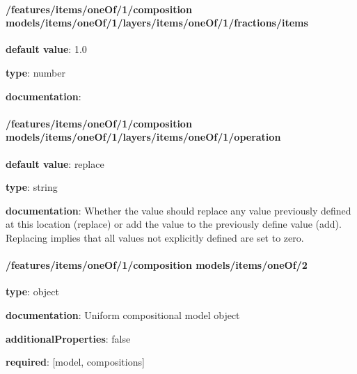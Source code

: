 \begin{itemized}
\paragraph{/features/items/oneOf/1/composition models/items/oneOf/1/layers/items/oneOf/1/fractions/items} \begin{itemized}
\item {\bf default value}: 1.0
\item {\bf type}: number
\item {\bf documentation}: 
\end{itemized}\end{itemized}\paragraph{/features/items/oneOf/1/composition models/items/oneOf/1/layers/items/oneOf/1/operation} \begin{itemized}
\item {\bf default value}: replace
\item {\bf type}: string
\item {\bf documentation}: Whether the value should replace any value previously defined at this location (replace) or add the value to the previously define value (add). Replacing implies that all values not explicitly defined are set to zero.
\end{itemized}\paragraph{/features/items/oneOf/1/composition models/items/oneOf/2} \begin{itemized}
\item {\bf type}: object
\item {\bf documentation}: Uniform compositional model object
\item {\bf additionalProperties}: false
\item {\bf required}: [model, compositions]\end{itemized}
